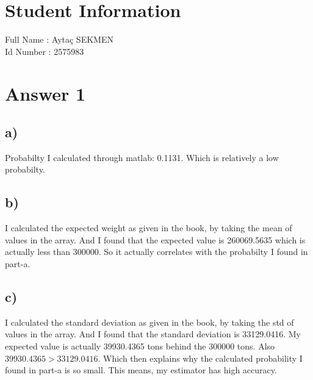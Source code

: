 \documentclass[12pt]{article}
\begin{document}
\section*{Student Information } 
Full Name :  Aytaç SEKMEN\\
Id Number :  2575983\\

\section*{Answer 1}

\subsection*{a)}
Probabilty I calculated through matlab: 0.1131. Which is relatively a low probabilty.

\subsection*{b)}
I calculated the expected weight as given in the book, by taking the mean of values in the array. And I found that the expected value is 260069.5635 which is actually less than 300000. So it actually correlates with the probabilty I found in part-a.


\subsection*{c)} 
I calculated the standard deviation as given in the book, by taking the std of values in the array. And I found that the standard deviation is 33129.0416. My expected value is actually 39930.4365 tons behind the 300000 tons. Also $39930.4365> 33129.0416$. Which then explains why the calculated probability I found in part-a is so small. This means, my estimator has high accuracy.
\end{document}
